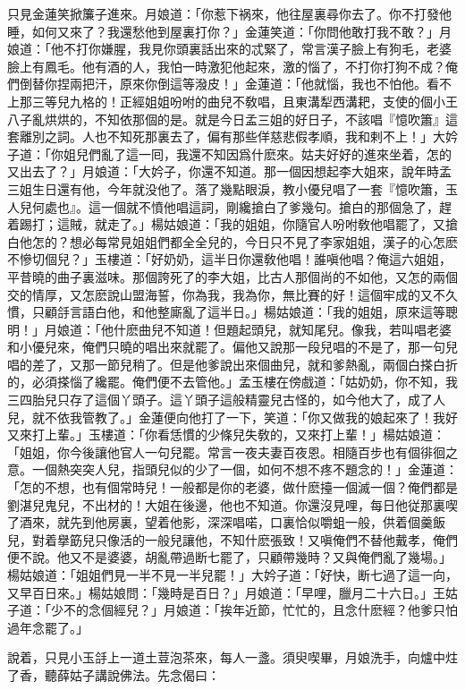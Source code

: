 只見金蓮笑掀簾子進來。月娘道：「你惹下祸來，他往屋裏尋你去了。你不打發他睡，如何又來了？我還愁他到屋裏打你？」金蓮笑道：「你問他敢打我不敢？」月娘道：「他不打你嫌腥，我見你頭裏話出來的忒緊了，常言漢子臉上有狗毛，老婆臉上有鳳毛。他有酒的人，我怕一時激犯他起來，激的惱了，不打你打狗不成？俺們倒替你捏兩把汗，原來你倒這等潑皮！」金蓮道：「他就惱，我也不怕他。看不上那三等兒九格的！正經姐姐吩咐的曲兒不敎唱，且東溝犁西溝耙，支使的個小王八子亂烘烘的，不知依那個的是。就是今日孟三姐的好日子，不該唱『憶吹簫』這套離別之詞。人也不知死那裏去了，偏有那些佯慈悲假孝順，我和剌不上！」大妗子道：「你姐兒們亂了這一囘，我還不知因爲什麽來。姑夫好好的進來坐着，怎的又出去了？」月娘道：「大妗子，你還不知道。那一個因想起李大姐來，說年時孟三姐生日還有他，今年就没他了。落了幾點眼淚，教小優兒唱了一套『憶吹簫，玉人兒何處也』。這一個就不憤他唱這詞，剛纔搶白了爹幾句。搶白的那個急了，趕着踢打；這賊，就走了。」楊姑娘道：「我的姐姐，你隨官人吩咐敎他唱罷了，又搶白他怎的？想必每常見姐姐們都全全兒的，今日只不見了李家姐姐，漢子的心怎麽不慘切個兒？」玉樓道：「好奶奶，這半日你還敎他唱！誰嗔他唱？俺這六姐姐，平昔曉的曲子裏滋味。那個誇死了的李大姐，比古人那個尚的不如他，又怎的兩個交的情厚，又怎麽說山盟海誓，你為我，我為你，無比賽的好！這個牢成的又不久慣，只顧㧱言語白他，和他整廝亂了這半日。」楊姑娘道：「我的姐姐，原來這等聰明！」月娘道：「他什麽曲兒不知道！但題起頭兒，就知尾兒。像我，若叫唱老婆和小優兒來，俺們只曉的唱出來就罷了。偏他又說那一段兒唱的不是了，那一句兒唱的差了，又那一節兒稍了。但是他爹說出來個曲兒，就和爹熱亂，兩個白搽白折的，必須搽惱了纔罷。俺們便不去管他。」孟玉樓在傍戲道：「姑奶奶，你不知，我三四胎兒只存了這個丫頭子。這丫頭子這般精靈兒古怪的，如今他大了，成了人兒，就不依我管教了。」金蓮便向他打了一下，笑道：「你又做我的娘起來了！我好又來打上輩。」玉樓道：「你看恁慣的少條兒失敎的，又來打上輩！」楊姑娘道：「姐姐，你今後讓他官人一句兒罷。常言一夜夫妻百夜恩。相隨百步也有個徘徊之意。一個熱突突人兒，指頭兒似的少了一個，如何不想不疼不題念的！」金蓮道：「怎的不想，也有個常時兒！一般都是你的老婆，做什麽擡一個滅一個？俺們都是劉湛兒鬼兒，不出材的！大姐在後邊，他也不知道。你還沒見哩，每日他従那裏喫了酒來，就先到他房裏，望着他影，深深唱喏，口裏恰似嚼蛆一般，供着個羹飯兒，對着擧筯兒只像活的一般兒讓他，不知什麽張致！又嗔俺們不替他戴孝，俺們便不說。他又不是婆婆，胡亂帶過断七罷了，只顧帶幾時？又與俺們亂了幾場。」楊姑娘道：「姐姐們見一半不見一半兒罷！」大妗子道：「好快，断七過了這一向，又早百日來。」楊姑娘問：「幾時是百日？」月娘道：「早哩，臘月二十六日。」王姑子道：「少不的念個經兒？」月娘道：「挨年近節，忙忙的，且念什麽經？他爹只怕過年念罷了。」

說着，只見小玉㧱上一道土荳泡茶來，每人一盞。須臾喫畢，月娘洗手，向爐中炷了香，聽薛姑子講說佛法。先念偈曰：

